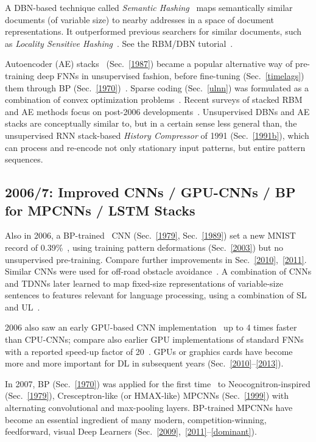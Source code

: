 \documentclass[letterpaper]{article}
\begin{document}
\begin{CJK*}{UTF8}{gbsn}
A DBN-based technique called
{\em Semantic Hashing}~\citep{salakhutdinov2009}
maps semantically similar documents (of variable size) to nearby addresses in 
a space of document representations. It
outperformed previous searchers for similar documents, 
such as {\em Locality Sensitive Hashing}~\citep{buhler2001,datar2004}.
See the RBM/DBN tutorial~\citep{fischer:13}.


Autoencoder (AE) stacks~\citep{ballard1987modular} (Sec.~\ref{1987}) 
became a popular alternative way of pre-training deep FNNs in 
unsupervised fashion, before fine-tuning (Sec.~\ref{timelags}) them through BP (Sec.~\ref{1970})~\citep{bengio2006,vincent:2008,erhan:10whydoes}. 
Sparse coding (Sec.~\ref{ulnn}) was formulated as 
a combination of convex optimization 
problems~\citep{sparse2007ng}.
Recent surveys of stacked RBM and AE methods focus
on post-2006 developments~\citep{bengio09,itamar2010}.
Unsupervised DBNs and AE stacks are conceptually similar to, but in a certain sense less general than, the
unsupervised RNN stack-based {\em History Compressor}
 of 1991 (Sec.~\ref{1991b}), which can process and re-encode
not only stationary input patterns, but 
entire pattern sequences. 



\subsection{2006/7: Improved CNNs / GPU-CNNs / BP for MPCNNs / LSTM Stacks}
\label{2007}


Also in 2006, a BP-trained~\citep{LeCun:89} CNN (Sec.~\ref{1979}, Sec.~\ref{1989}) 
set a new MNIST record of 0.39\%~\citep{ranzato-06},
using training pattern
deformations (Sec.~\ref{2003}) but no unsupervised pre-training.
Compare further improvements in Sec.~\ref{2010},~\ref{2011}.
Similar CNNs were used for off-road obstacle avoidance~\citep{LeCun:06}.
A combination of CNNs and TDNNs later learned to map fixed-size representations of
variable-size sentences to features
relevant for language processing, 
using a combination of SL and UL~\citep{weston2008}.


2006 also saw an early GPU-based CNN implementation~\citep{chellapilla:2006b} up to 4 times faster
than CPU-CNNs;
compare also earlier GPU implementations of standard FNNs with a reported speed-up factor of 20~\citep{gpu2004}.
GPUs or graphics cards  have become more and more important for DL in 
subsequent years (Sec.~\ref{2010}--\ref{2013}).

In 2007, BP (Sec.~\ref{1970}) was applied for the first time~\citep{ranzato-cvpr-07}  to 
Neocognitron-inspired (Sec.~\ref{1979}),
Cresceptron-like (or HMAX-like) MPCNNs (Sec.~\ref{1999})
with alternating convolutional and max-pooling layers.
BP-trained MPCNNs  have become an 
essential ingredient of many modern, competition-winning, feedforward, visual Deep Learners (Sec.~\ref{2009},~\ref{2011}--\ref{dominant}). 


\end{CJK*}
\end{document}
